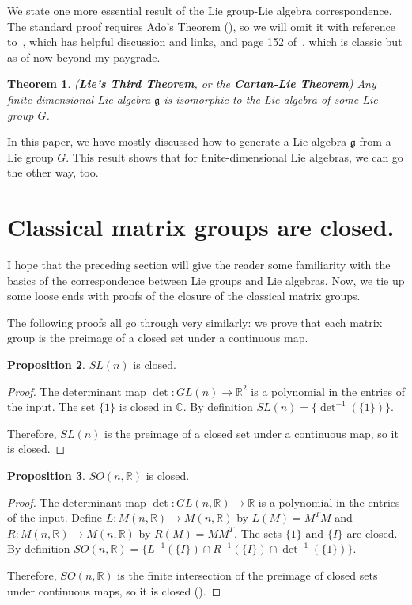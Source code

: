\documentclass[12pt]{article}
\newcommand{\C}{\mathbb{C}}
\newcommand{\R}{\mathbb{R}}
\newcommand{\g}{\mathfrak{g}}
\newcommand{\son}{SO (n, \R)}
\newtheorem{them}{Theorem}[section]
\theoremstyle{definition}
\newtheorem{prop}[them]{Proposition}
\theoremstyle{definition}
\theoremstyle{definition}
\theoremstyle{definition}
\theoremstyle{definition}
\theoremstyle{definition}
\theoremstyle{definition}
\theoremstyle{definition}
\begin{document}
\vspace{6pt}
\par{We state one more essential result of the Lie
group-Lie algebra correspondence. The standard proof
requires Ado’s Theorem (), so we
will omit it with reference to~\cite{LieThree},
which has helpful discussion and links, and page
152 of~\cite{Serre}, which is classic but as of
now beyond my paygrade.}

\begin{them} 
(\textbf{Lie’s Third Theorem}, or the
\textbf{Cartan-Lie Theorem}) Any
finite-dimensional Lie algebra $\g$ is isomorphic
to the Lie algebra of some Lie group $G$.
\end{them}

\par{In this paper, we have mostly discussed how to generate a Lie algebra $\g$ from a Lie group $G$. This result shows that for finite-dimensional Lie algebras, we can go the other way, too.}

\section{Classical matrix groups are closed.}

\par{I hope that the preceding section will give
the reader some familiarity with the basics of the
correspondence between Lie groups and Lie
algebras. Now, we tie up some loose ends with proofs of
the closure of the classical matrix groups.}

\vspace{6pt}
\par{The following proofs all go through very
similarly: we prove that each matrix group is the
preimage of a closed set under a continuous map.}

\begin{prop}
$SL(n)$ is closed.
\end{prop}
\begin{proof}
\par{The determinant map $\det: GL(n) \to
\R^2$ is a polynomial in the entries of the
input. The set $\{1\}$ is closed in $\C$. By
definition $SL(n) = \{\det^{-1}(\{1\})\}$.}
\par{Therefore, $SL(n)$ is the preimage of a
closed set under a continuous map, so it is
closed.}
\end{proof}
    
\begin{prop}
$\son$ is closed.
\end{prop}
\begin{proof}
\par{The determinant map $\det: GL(n, \R) \to
\R$ is a polynomial in the entries of the
input. Define $L: M(n, \R) \to M(n, \R)$ by
$L(M) = M^T M$ and $R: M(n, \R) \to M(n, \R)$
by $R(M) = MM^T$. The sets $\{1\}$ and $\{I\}$
are closed. By definition $\son =
\{L^{-1}(\{I\}) \cap R^{-1}(\{I\}) \cap
\det^{-1}(\{1\})\}$.} 
\par{Therefore, $\son$
is the finite intersection of the preimage of
closed sets under continuous maps, so it is
closed (\cite{freakish}).}
\end{proof}
\end{document}
